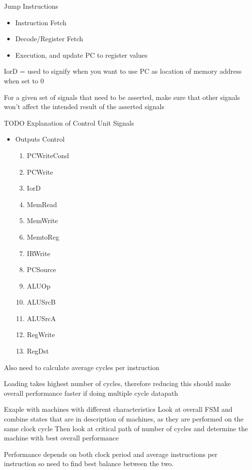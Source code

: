 \documentclass{article}
\begin{document}
		Jump Instructions
		\begin{itemize}
			\item Instruction Fetch
			\item Decode/Register Fetch
			\item Execution, and update PC to register values
		\end{itemize}

		IorD = used to signify when you want to use PC as location of memory address when set to 0

		For a given set of signals that need to be asserted, make sure that other signals won't affect the intended result of the asserted signals

		TODO
		Explanation of Control Unit Signals
		\begin{itemize}
			\item Outputs Control
			\begin{enumerate}
				\item PCWriteCond
				\item PCWrite
				\item IorD
				\item MemRead
				\item MemWrite
				\item MemtoReg
				\item IRWrite
				\item PCSource
				\item ALUOp
				\item ALUSrcB
				\item ALUSrcA
				\item RegWrite
				\item RegDst
			\end{enumerate}
		\end{itemize}
		
	Also need to calculate average cycles per instruction

	Loading takes highest number of cycles, therefore reducing this should make overall performance faster if doing multiple cycle datapath

	Exaple with machines with different characteristics
		Look at overall FSM and combine states that are in description of machines, as they are performed on the same clock cycle
		Then look at critical path of number of cycles and determine the machine with best overall performance 

	Performance depends on both clock period and average instructions per instruction so need to find best balance between the two.
\end{document}
